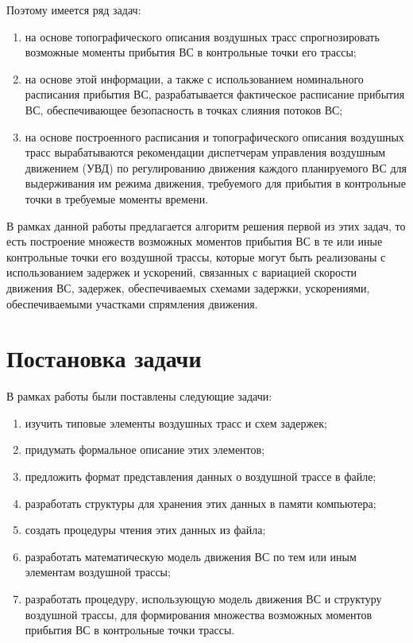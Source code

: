 \documentclass[12pt]{article}
\theoremstyle{plain}
\begin{document}
Поэтому имеется ряд задач:
\begin{enumerate}[topsep=-0.5\parsep,itemsep=-0.5\parsep]
  \item на основе топографического описания воздушных трасс спрогнозировать возможные моменты прибытия ВС в контрольные точки его трассы;

  \item на основе этой информации, а также с использованием номинального расписания прибытия ВС, разрабатывается фактическое расписание прибытия ВС, обеспечивающее безопасность в точках слияния потоков ВС;

  \item на основе построенного расписания и топографического описания воздушных трасс вырабатываются рекомендации диспетчерам управления воздушным движением (УВД) по регулированию движения каждого планируемого ВС для выдерживания им режима движения, требуемого для прибытия в контрольные точки в требуемые моменты времени.
\end{enumerate}

В рамках данной работы предлагается алгоритм решения первой из этих задач, то есть построение множеств возможных моментов прибытия ВС в те или иные контрольные точки его воздушной трассы, которые могут быть реализованы с использованием задержек и ускорений, связанных с вариацией скорости движения ВС, задержек, обеспечиваемых схемами задержки, ускорениями, обеспечиваемыми участками спрямления движения. 

\section{Постановка задачи}

В рамках работы были поставлены следующие задачи:
\begin{enumerate}[topsep=-0.5\parsep,itemsep=-0.5\parsep]
  \item изучить типовые элементы воздушных трасс и схем задержек; 
  \item придумать формальное описание этих элементов;
  \item предложить формат представления данных о воздушной трассе в файле;
  \item разработать структуры для хранения этих данных в памяти компьютера;
  \item создать процедуры чтения этих данных из файла;
  \item разработать математическую модель движения ВС по тем или иным элементам воздушной трассы;
  \item разработать процедуру, использующую модель движения ВС и структуру воздушной трассы, для формирования множества возможных моментов прибытия ВС в контрольные точки трассы.
\end{enumerate}
\end{document}
